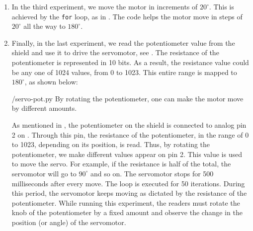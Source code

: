 \begin{enumerate}
        
  \item In the third experiment, we move the motor in increments of
        $20^\circ$.  This is achieved by the {\tt for} loop, as in
        . The code helps the motor move in steps of $20^\circ$ all
        the way to $180^\circ$.  
        
  \item Finally, in the last experiment, we read the potentiometer value
        from the shield and use it to drive the servomotor, see
        .  The resistance of the potentiometer is
        represented in 10 bits.  As a result, the resistance value could be
        any one of 1024 values, from 0 to 1023.  This entire range is
        mapped to $180^\circ$, as shown below:
        
        {\LocSERpycode/servo-pot.py}
        By rotating the potentiometer, one can make
        the motor move by different amounts.
        
        As mentioned in , the potentiometer on the shield is connected 
        to analog pin 2 on \arduino. Through this pin, the resistance of the potentiometer, in the range of 0 to 1023,
        depending on its position, is read.  Thus, by rotating the
        potentiometer, we make different values appear on pin 2.  This value
        is used to move the servo.  For example, if the resistance is half
        of the total, the servomotor will go to $90^\circ$ and so on.  The
        servomotor stops for 500 milliseconds after every move.  The loop is
        executed for 50 iterations. During this period, the servomotor keeps moving as dictated by the
        resistance of the potentiometer. While running this experiment, the readers 
        must rotate the knob of the potentiometer by a fixed amount and observe 
        the change in the position (or angle) of the servomotor.   
        
        

\end{enumerate}
